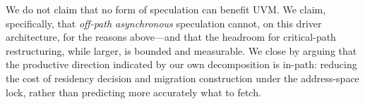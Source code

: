 We do not claim that no form of speculation can benefit UVM. We claim,
specifically, that \emph{off-path asynchronous} speculation cannot, on this
driver architecture, for the reasons above---and that the headroom for
critical-path restructuring, while larger, is bounded and measurable. We close
by arguing that the productive direction indicated by our own decomposition is
in-path: reducing the cost of residency decision and migration construction
under the address-space lock, rather than predicting more accurately what to
fetch.
